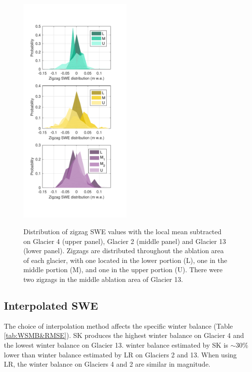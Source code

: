 \documentclass[twocolumn, letterpaper]{igs}
\begin{document}
\begin{figure}
	\centering
	\includegraphics[width =0.5\textwidth]{ZigzagHistogram.pdf}\\
	\caption{Distribution of zigzag SWE values with the local mean subtracted on Glacier 4 (upper panel), Glacier 2 (middle panel) and Glacier 13 (lower panel). Zigzags are distributed throughout the ablation area of each glacier, with one located in the lower portion (L), one in the middle portion (M), and one in the upper portion (U). There were two zigzags in the middle ablation area of Glacier 13.}
	\label{fig:ZigzagHistogram}
\end{figure}

\subsection{Interpolated SWE}
 
The choice of interpolation method affects the specific winter balance (Table \ref{tab:WSMB&RMSE}). SK produces the highest winter balance on Glacier 4 and the lowest winter balance on Glacier 13. winter balance estimated by SK is $\sim$30\% lower than winter balance estimated by LR on Glaciers 2 and 13. When using LR, the winter balance on Glaciers 4 and 2 are similar in magnitude.
\end{document}
